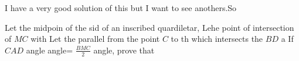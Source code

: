 I have a very good solution of this but I want to see anothers.So

Let the midpoin of the sid of an inscribed quardiletar, Lehe point of intersection of $MC$ with  Let the parallel from the point $C$ to th which intersects the $BD$ a If $CAD$ angle angle= $\frac{BMC}{2}$ angle, prove that 